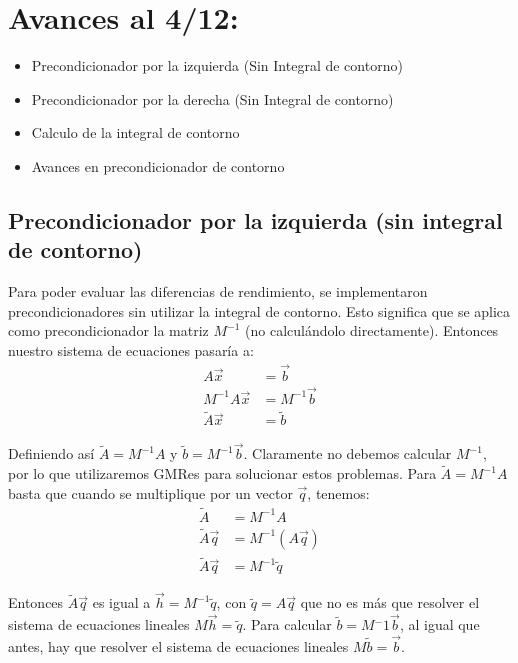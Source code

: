 \documentclass[fleqn]{article}
\begin{document}
\newpage
\section{Avances al 4/12:}

\begin{itemize}
\item Precondicionador por la izquierda (Sin Integral de contorno)
\item Precondicionador por la derecha (Sin Integral de contorno) 
\item Calculo de la integral de contorno 
\item Avances en precondicionador de contorno
\end{itemize}

\subsection{Precondicionador por la izquierda (sin integral de contorno)}
Para poder evaluar las diferencias de rendimiento, se implementaron precondicionadores sin utilizar la integral de contorno. Esto significa que se aplica como precondicionador la matriz $M^{-1}$ (no calculándolo directamente). Entonces nuestro sistema de ecuaciones pasaría a:
\begin{align*}
    A\vec{x} &= \vec{b} \\
    M^{-1}A\vec{x} &= M^{-1}\vec{b} \\
    \widetilde{A}\vec{x} &= \widetilde{b}
\end{align*}

Definiendo así $\widetilde{A} = M^{-1}A$ y $\widetilde{b} = M^{-1}\vec{b}$. Claramente no debemos calcular $M^{-1}$, por lo que utilizaremos GMRes para solucionar estos problemas. Para $\widetilde{A} = M^{-1}A$ basta que cuando se multiplique por un vector $\vec{q}$, tenemos:
\begin{align*}
    \widetilde{A} &= M^{-1}A \\
    \widetilde{A}\vec{q} &= M^{-1}(A\vec{q}) \\
    \widetilde{A}\vec{q} &= M^{-1}\widetilde{q}
\end{align*}

Entonces $\widetilde{A}\vec{q}$ es igual a $\vec{h} = M^{-1}\widetilde{q}$, con $\widetilde{q} = A\vec{q}$ que no es más que resolver el sistema de ecuaciones lineales $M\vec{h} = \widetilde{q}$. Para calcular $\widetilde{b} = M{^-1}\vec{b}$, al igual que antes, hay que resolver el sistema de ecuaciones lineales $M\widetilde{b} = \vec{b}$.\newpage
 
\end{document}
